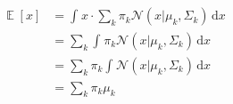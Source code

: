 \documentclass[11pt]{article}
\newcommand{\exercise}{\section{}}
\DeclareMathOperator{\E}{\mathbb{E}}
\newcommand{\intf}[4]{\int_{#1}^{#2} \! #3 \, \mathrm{d}#4}
\newcommand{\sumf}[3]{\sum_{#1}^{#2} #3}
\begin{document}
\exercise

\begin{align*}
\E[x] &= \intf{}{}{x \cdot \sumf{k}{}{\pi_k \mathcal{N}(x | \mu_k, \Sigma_k)} }{x} \\
&= \sumf{k}{}{ \intf{}{}{\pi_k \mathcal{N}(x | \mu_k, \Sigma_k)}{x}} \\
&= \sumf{k}{}{ \pi_k \intf{}{}{ \mathcal{N}(x | \mu_k, \Sigma_k)}{x}} \\
&= \sumf{k}{}{ \pi_k \mu_k }
\end{align*}

\exercise

\exercise
\end{document}
